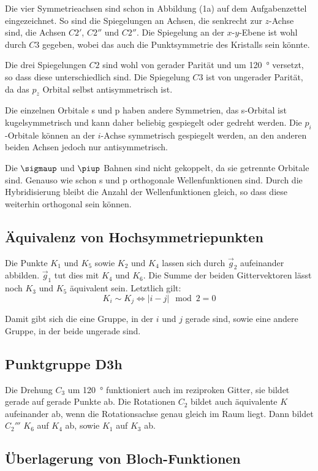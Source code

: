 Die vier Symmetrieachsen sind schon in Abbildung (1a) auf dem Aufgabenzettel
eingezeichnet. So sind die Spiegelungen an Achsen, die senkrecht zur $z$-Achse
sind, die Achsen $C2'$, $C2''$ und $C2''$. Die Spiegelung an der $x$-$y$-Ebene
ist wohl durch $C3$ gegeben, wobei das auch die Punktsymmetrie des Kristalls
sein könnte.

Die drei Spiegelungen $C2$ sind wohl von gerader Parität und um
\SI{120}{\degree} versetzt, so dass diese unterschiedlich sind. Die Spiegelung
$C3$ ist von ungerader Parität, da das $p_z$ Orbital selbst antisymmetrisch
ist.

Die einzelnen Orbitale s und p haben andere Symmetrien, das s-Orbital ist
kugelsymmetrisch und kann daher beliebig gespiegelt oder gedreht werden. Die
$p_i$-Orbitale können an der $i$-Achse symmetrisch gespiegelt werden, an den
anderen beiden Achsen jedoch nur antisymmetrisch.

Die $\sigmaup$ und $\piup$ Bahnen sind nicht gekoppelt, da sie getrennte
Orbitale sind. Genauso wie schon s und p orthogonale Wellenfunktionen sind.
Durch die Hybridisierung bleibt die Anzahl der Wellenfunktionen gleich, so dass
diese weiterhin orthogonal sein können.

\subsection{Äquivalenz von Hochsymmetriepunkten}

Die Punkte $K_1$ und $K_5$ sowie $K_2$ und $K_4$ lassen sich durch $\vec g_2$
aufeinander abbilden. $\vec g_1$ tut dies mit $K_4$ und $K_6$. Die Summe der
beiden Gittervektoren lässt noch $K_3$ und $K_5$ äquivalent sein. Letztlich
gilt:
\[
	K_i \sim K_j
	\iff
	|i - j| \mod 2 = 0
\]

Damit gibt sich die eine Gruppe, in der $i$ und $j$ gerade sind, sowie eine
andere Gruppe, in der beide ungerade sind.

\subsection{Punktgruppe D3h}

Die Drehung $C_3$ um \SI{120}{\degree} funktioniert auch im reziproken Gitter,
sie bildet gerade auf gerade Punkte ab. Die Rotationen $C_2$ bildet auch
äquivalente $K$ aufeinander ab, wenn die Rotationsachse genau gleich im Raum
liegt. Dann bildet $C_2'''$ $K_6$ auf $K_4$ ab, sowie $K_1$ auf $K_3$ ab.

\subsection{Überlagerung von Bloch-Funktionen}

